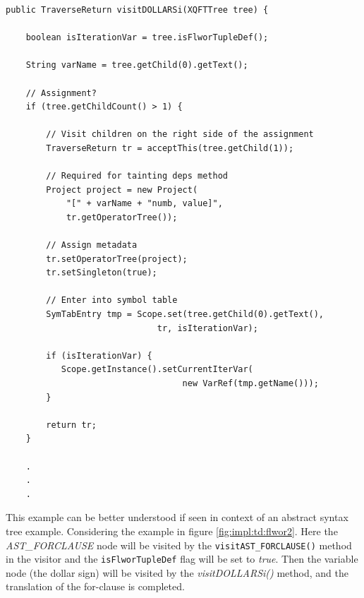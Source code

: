\begin{Verbatim}
public TraverseReturn visitDOLLARSi(XQFTTree tree) {
      
    boolean isIterationVar = tree.isFlworTupleDef();
      
    String varName = tree.getChild(0).getText();
      
    // Assignment?
    if (tree.getChildCount() > 1) {
         
        // Visit children on the right side of the assignment
        TraverseReturn tr = acceptThis(tree.getChild(1));
          
        // Required for tainting deps method
        Project project = new Project(
            "[" + varName + "numb, value]", 
            tr.getOperatorTree());

        // Assign metadata
        tr.setOperatorTree(project);
        tr.setSingleton(true);
          
        // Enter into symbol table
        SymTabEntry tmp = Scope.set(tree.getChild(0).getText(), 
                              tr, isIterationVar);
          
        if (isIterationVar) {
           Scope.getInstance().setCurrentIterVar(
                                   new VarRef(tmp.getName()));
        }
          
        return tr;
    }

    .
    .
    .
\end{Verbatim}

This example can be better understood if seen in context of an abstract syntax
tree example. Considering the example in figure \ref{fig:impl:td:flwor2}. Here
the \textit{AST\_FORCLAUSE} node will be visited by the
\texttt{visitAST\_FORCLAUSE()} method in the visitor and the
\texttt{isFlworTupleDef} flag will be set to \textit{true}. Then the variable
node (the dollar sign) will be visited by the \textit{visitDOLLARSi()} method,
and the translation of the for-clause is completed.

